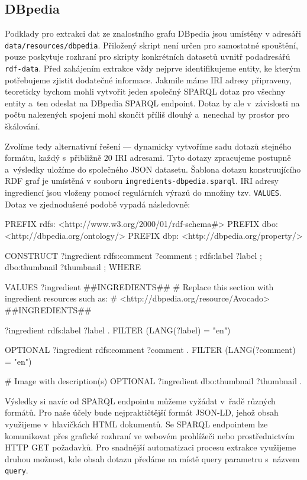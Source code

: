 \subsection{DBpedia}

Podklady pro extrakci dat ze znalostního grafu DBpedia jsou umístěny v adresáři \texttt{data/resources/dbpedia}. Přiložený skript není určen pro samostatné spouštění, pouze poskytuje rozhraní pro skripty konkrétních datasetů uvnitř podadresářů \texttt{rdf-data}. Před zahájením extrakce vždy nejprve identifikujeme entity, ke kterým potřebujeme zjistit dodatečné informace. Jakmile máme IRI adresy připraveny, teoreticky bychom mohli vytvořit jeden společný SPARQL dotaz pro všechny entity a~ten odeslat na DBpedia SPARQL endpoint. Dotaz by ale v~závislosti na počtu nalezených spojení mohl skončit příliš dlouhý a~nenechal by prostor pro škálování.

Zvolíme tedy alternativní řešení --- dynamicky vytvoříme sadu dotazů stejného formátu, každý s~přibližně $20$ IRI adresami. Tyto dotazy zpracujeme postupně a~výsledky uložíme do společného JSON datasetu. Šablona dotazu konstruujícího RDF graf je umístěná v souboru \texttt{ingredients-dbpedia.sparql}. IRI adresy ingrediencí jsou vloženy pomocí regulárních výrazů do množiny tzv. \texttt{VALUES}. Dotaz ve zjednodušené podobě vypadá následovně:

\begin{code}
PREFIX rdfs: <http://www.w3.org/2000/01/rdf-schema#>
PREFIX dbo: <http://dbpedia.org/ontology/>
PREFIX dbp: <http://dbpedia.org/property/>

CONSTRUCT {
    ?ingredient rdfs:comment ?comment ;
                rdfs:label ?label ;
                dbo:thumbnail ?thumbnail ;
}
WHERE {
    VALUES ?ingredient { 
        ##INGREDIENTS## 
        # Replace this section with ingredient resources such as:
        # <http://dbpedia.org/resource/Avocado>
        ##INGREDIENTS##
    }

    ?ingredient rdfs:label ?label .
    FILTER (LANG(?label) = "en")
    
    OPTIONAL {
        ?ingredient rdfs:comment ?comment .
        FILTER (LANG(?comment) = "en")
    }

    # Image with description(s)
    OPTIONAL {?ingredient dbo:thumbnail ?thumbnail .}
}
\end{code}

Výsledky si navíc od SPARQL endpointu můžeme vyžádat v~řadě různých formátů. Pro naše účely bude nejpraktičtější formát JSON-LD, jehož obsah využijeme v~hlavičkách HTML dokumentů. Se SPARQL endpointem lze komunikovat přes grafické rozhraní ve webovém prohlížeči nebo prostřednictvím HTTP GET požadavků. Pro snadnější automatizaci procesu extrakce využijeme druhou možnost, kde obsah dotazu předáme na místě query parametru s~názvem \texttt{query}. 

